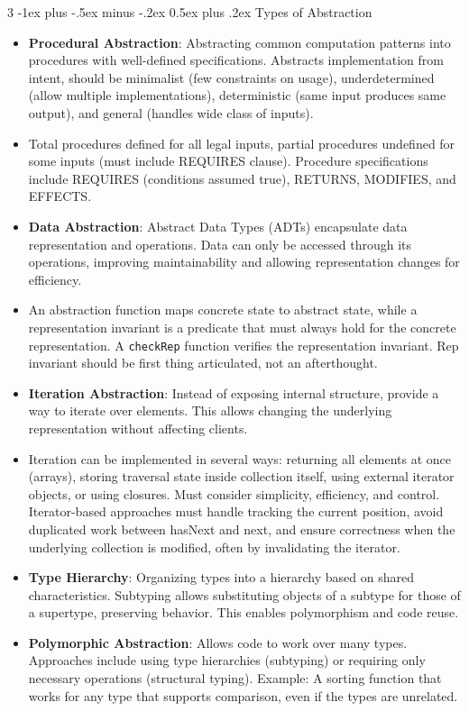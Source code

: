\documentclass[a4paper, 9pt, landscape]{extarticle}
\makeatletter
\renewcommand{\subsection}{\@startsection{subsubsection}{3}{0mm}%
                                {-1ex plus -.5ex minus -.2ex}%
                                {0.5ex plus .2ex}%
                                {\normalfont\small\bfseries}}
\makeatother
\begin{document}
\begin{multicols*}{3}
\subsection{Types of Abstraction}
\begin{itemize}
  \item \textbf{Procedural Abstraction}: Abstracting common computation patterns into procedures with well-defined specifications. Abstracts implementation from intent, should be minimalist (few constraints on usage), underdetermined (allow multiple implementations), deterministic (same input produces same output), and general (handles wide class of inputs).
  \item Total procedures defined for all legal inputs, partial procedures undefined for some inputs (must include REQUIRES clause). Procedure specifications include REQUIRES (conditions assumed true), RETURNS, MODIFIES, and EFFECTS.
  \item \textbf{Data Abstraction}: Abstract Data Types (ADTs) encapsulate data representation and operations. Data can only be accessed through its operations, improving maintainability and allowing representation changes for efficiency.
  \item An abstraction function maps concrete state to abstract state, while a representation invariant is a predicate that must always hold for the concrete representation. A \texttt{checkRep} function verifies the representation invariant. Rep invariant should be first thing articulated, not an afterthought.
  \item \textbf{Iteration Abstraction}: Instead of exposing internal structure, provide a way to iterate over elements. This allows changing the underlying representation without affecting clients.
  \item Iteration can be implemented in several ways: returning all elements at once (arrays), storing traversal state inside collection itself, using external iterator objects, or using closures. Must consider simplicity, efficiency, and control. Iterator-based approaches must handle tracking the current position, avoid duplicated work between hasNext and next, and ensure correctness when the underlying collection is modified, often by invalidating the iterator.
  \item \textbf{Type Hierarchy}: Organizing types into a hierarchy based on shared characteristics. Subtyping allows substituting objects of a subtype for those of a supertype, preserving behavior. This enables polymorphism and code reuse.
  \item \textbf{Polymorphic Abstraction}: Allows code to work over many types. Approaches include using type hierarchies (subtyping) or requiring only necessary operations (structural typing). Example: A sorting function that works for any type that supports comparison, even if the types are unrelated.
\end{itemize}


\end{multicols*}
\end{document}
